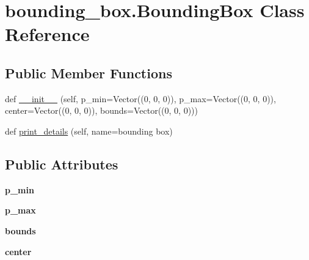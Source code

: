 \hypertarget{classbounding__box_1_1BoundingBox}{}\section{bounding\+\_\+box.\+Bounding\+Box Class Reference}
\label{classbounding__box_1_1BoundingBox}


 


\subsection*{Public Member Functions}
\begin{DoxyCompactItemize}
\item 
def \hyperlink{classbounding__box_1_1BoundingBox_af44212de12a68ed323894a39ff335ac2}{\+\_\+\+\_\+init\+\_\+\+\_\+} (self, p\+\_\+min=Vector((0, 0, 0)), p\+\_\+max=Vector((0, 0, 0)), center=Vector((0, 0, 0)), bounds=Vector((0, 0, 0)))
\item 
def \hyperlink{classbounding__box_1_1BoundingBox_a6b9ccea24377f0cd998659e7290f3f46}{print\+\_\+details} (self, name=\textquotesingle{}bounding box\textquotesingle{})
\end{DoxyCompactItemize}
\subsection*{Public Attributes}
\begin{DoxyCompactItemize}
\item 
{\bfseries p\+\_\+min}\hypertarget{classbounding__box_1_1BoundingBox_a76e248e1ef35e2b2e4e6d2502b931c13}{}\label{classbounding__box_1_1BoundingBox_a76e248e1ef35e2b2e4e6d2502b931c13}

\item 
{\bfseries p\+\_\+max}\hypertarget{classbounding__box_1_1BoundingBox_ad4385c80da2e9f846b2cf62668d652b1}{}\label{classbounding__box_1_1BoundingBox_ad4385c80da2e9f846b2cf62668d652b1}

\item 
{\bfseries bounds}\hypertarget{classbounding__box_1_1BoundingBox_acd7d082204e9ec98b42c77b901c3b458}{}\label{classbounding__box_1_1BoundingBox_acd7d082204e9ec98b42c77b901c3b458}

\item 
{\bfseries center}\hypertarget{classbounding__box_1_1BoundingBox_a8b15528d7861906b5590e8f8982daf05}{}\label{classbounding__box_1_1BoundingBox_a8b15528d7861906b5590e8f8982daf05}

\end{DoxyCompactItemize}


